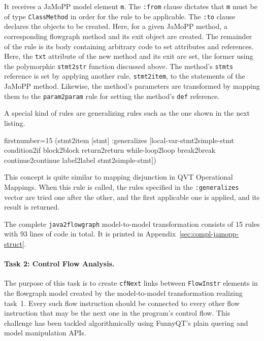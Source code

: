 \documentclass[submission]{eptcs}
\begin{document}
It receives a JaMoPP model element \verb|m|.  The \verb|:from| clause dictates
that \verb|m| must be of type \verb|ClassMethod| in order for the rule to be
applicable.  The \verb|:to| clause declares the objects to be created.  Here,
for a given JaMoPP method, a corresponding flowgraph method and its exit object
are created.  The remainder of the rule is its body containing arbitrary code
to set attributes and references.  Here, the \verb|txt| attribute of the new
method and its exit are set, the former using the polymorphic \verb|stmt2str|
function discussed above.  The method's \verb|stmts| reference is set by
applying another rule, \verb|stmt2item|, to the statements of the JaMoPP
method.  Likewise, the method's parameters are transformed by mapping them to
the \verb|param2param| rule for setting the method's \verb|def| reference.

A special kind of rules are generalizing rules such as the one shown in the
next listing.

\begin{clojurecode*}{firstnumber=15}
  (stmt2item [stmt]
      :generalizes [local-var-stmt2simple-stmt condition2if block2block
                    return2return while-loop2loop break2break continue2continue
                    label2label stmt2simple-stmt])
\end{clojurecode*}

This concept is quite similar to mapping disjunction in QVT Operational
Mappings.  When this rule is called, the rules specified in the
\verb|:generalizes| vector are tried one after the other, and the first
applicable one is applied, and its result is returned.

The complete \verb|java2flowgraph| model-to-model transformation consists of 15
rules with 93 lines of code in total.  It is printed in
Appendix~\ref{sec:compl-jamopp-struct}.


\paragraph{Task 2: Control Flow Analysis.}
\label{sec:task-2}

The purpose of this task is to create \verb|cfNext| links between
\verb|FlowInstr| elements in the flowgraph model created by the model-to-model
transformation realizing task~1.  Every such flow instruction should be
connected to every other flow instruction that may be the next one in the
program's control flow.  This challenge has been tackled algorithmically using
FunnyQT's plain quering and model manipulation APIs.
\end{document}
